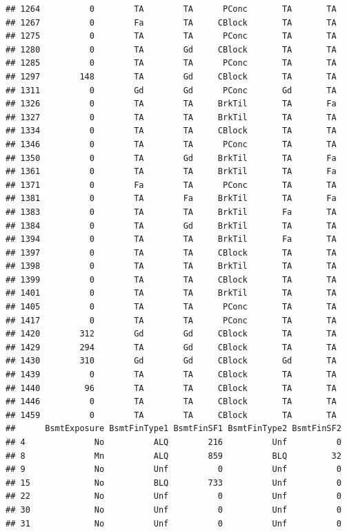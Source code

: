 \documentclass[]{article}
\begin{document}
\begin{verbatim}
## 1264          0        TA        TA      PConc       TA       TA
## 1267          0        Fa        TA     CBlock       TA       TA
## 1275          0        TA        TA      PConc       TA       TA
## 1280          0        TA        Gd     CBlock       TA       TA
## 1285          0        TA        TA      PConc       TA       TA
## 1297        148        TA        Gd     CBlock       TA       TA
## 1311          0        Gd        Gd      PConc       Gd       TA
## 1326          0        TA        TA     BrkTil       TA       Fa
## 1327          0        TA        TA     BrkTil       TA       TA
## 1334          0        TA        TA     CBlock       TA       TA
## 1346          0        TA        TA      PConc       TA       TA
## 1350          0        TA        Gd     BrkTil       TA       Fa
## 1361          0        TA        TA     BrkTil       TA       Fa
## 1371          0        Fa        TA      PConc       TA       TA
## 1381          0        TA        Fa     BrkTil       TA       Fa
## 1383          0        TA        TA     BrkTil       Fa       TA
## 1384          0        TA        Gd     BrkTil       TA       TA
## 1394          0        TA        TA     BrkTil       Fa       TA
## 1397          0        TA        TA     CBlock       TA       TA
## 1398          0        TA        TA     BrkTil       TA       TA
## 1399          0        TA        TA     CBlock       TA       TA
## 1401          0        TA        TA     BrkTil       TA       TA
## 1405          0        TA        TA      PConc       TA       TA
## 1417          0        TA        TA      PConc       TA       TA
## 1420        312        Gd        Gd     CBlock       TA       TA
## 1429        294        TA        Gd     CBlock       TA       TA
## 1430        310        Gd        Gd     CBlock       Gd       TA
## 1439          0        TA        TA     CBlock       TA       TA
## 1440         96        TA        TA     CBlock       TA       TA
## 1446          0        TA        TA     CBlock       TA       TA
## 1459          0        TA        TA     CBlock       TA       TA
##      BsmtExposure BsmtFinType1 BsmtFinSF1 BsmtFinType2 BsmtFinSF2
## 4              No          ALQ        216          Unf          0
## 8              Mn          ALQ        859          BLQ         32
## 9              No          Unf          0          Unf          0
## 15             No          BLQ        733          Unf          0
## 22             No          Unf          0          Unf          0
## 30             No          Unf          0          Unf          0
## 31             No          Unf          0          Unf          0

\end{verbatim}
\end{document}

